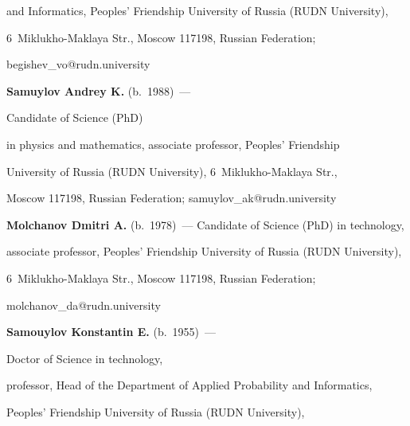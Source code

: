 and Informatics, Peoples' Friendship University of Russia (RUDN University), 


6~Miklukho-Maklaya Str., Moscow 117198, Russian Federation;


\mbox{begishev\_vo@rudn.university}





\vspace*{3pt}





\noindent


\textbf{Samuylov Andrey K.} (b.\ 1988)~---


Candidate of Science (PhD) 


in physics and mathematics, associate professor, Peoples' Friendship 


University of Russia (RUDN University), 6~Miklukho-Maklaya Str., 


Moscow 117198, Russian Federation; \mbox{samuylov\_ak@rudn.university}





\vspace*{3pt}








\noindent


\textbf{Molchanov Dmitri A.} (b.\ 1978)~--- Candidate of Science (PhD) in technology, 


associate professor, Peoples' Friendship University of Russia (RUDN University), 


6~Miklukho-Maklaya Str., Moscow 117198, Russian Federation;


\mbox{molchanov\_da@rudn.university}





\vspace*{3pt}








\noindent


\textbf{Samouylov Konstantin E.} (b.\ 1955)~---


Doctor of Science in technology,


 professor, Head of the Department of Applied Probability and Informatics, 


 Peoples' Friendship University of Russia (RUDN University), 


